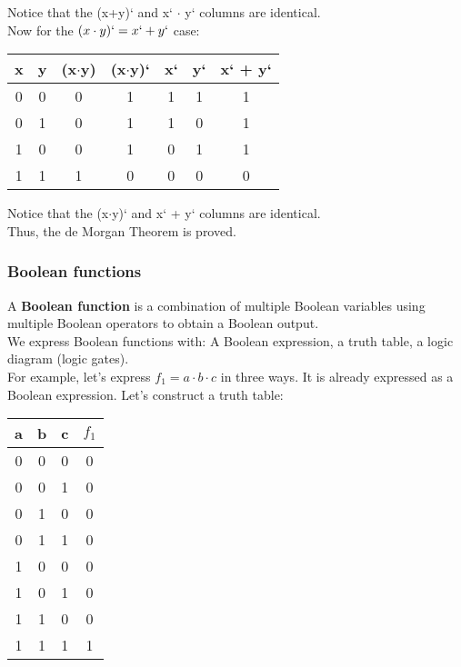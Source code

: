 \documentclass[]{article}
\begin{document}
Notice that the (x+y)` and x` $\cdot$ y` columns are identical.\\

Now for the $(x \cdot y)` = x` + y`$ case:\\

\begin{center}
	\begin{tabular}{|c|c|c|c|c|c|c|}
		x & y & (x$\cdot$y) & (x$\cdot$y)` & x` & y` & x` + y` \\\hline
		0 & 0 & 0 & 1 & 1 & 1 & 1 \\
		0 & 1 & 0 & 1 & 1 & 0 & 1 \\
		1 & 0 & 0 & 1 & 0 & 1 & 1 \\
		1 & 1 & 1 & 0 & 0 & 0 & 0 \\
	\end{tabular}
	\bigbreak
\end{center}

Notice that the (x$\cdot$y)` and x` + y` columns are identical.\\

Thus, the de Morgan Theorem is proved.\\


\subsubsection{Boolean functions}

A \textbf{Boolean function} is a combination of multiple Boolean variables using multiple Boolean operators to obtain a Boolean output.\\

We express Boolean functions with: A Boolean expression, a truth table, a logic diagram (logic gates).\\

For example, let's express $f_1 = a \cdot b \cdot c$ in three ways. It is already expressed as a Boolean expression. Let's construct a truth table:

\begin{center}
	\begin{tabular}{|c|c|c|c|}
		a & b & c & $f_1$ \\\hline
		0 & 0 & 0 & 0 \\
		0 & 0 & 1 & 0 \\
		0 & 1 & 0 & 0 \\
		0 & 1 & 1 & 0 \\
		1 & 0 & 0 & 0 \\
		1 & 0 & 1 & 0 \\
		1 & 1 & 0 & 0 \\
		1 & 1 & 1 & 1 \\
	\end{tabular}
	\bigbreak
\end{center}
\end{document}
